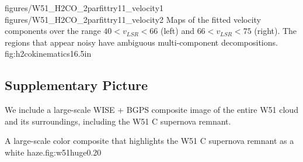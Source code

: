 \FigureTwoAA
{figures/W51_H2CO_2parfittry11_velocity1}
{figures/W51_H2CO_2parfittry11_velocity2}
{Maps of the fitted \formaldehyde velocity components over the range $40 <
v_{LSR} < 66$ \kms (left) and $66 < v_{LSR} < 75$ \kms (right).  The regions
that appear noisy have ambiguous multi-component decompositions.  }
{fig:h2cokinematics}{1}{6.5in}

\subsection{Supplementary Picture}
We include a large-scale WISE + BGPS composite image of the entire W51 cloud and its
surroundings, including the W51 C supernova remnant.

{A large-scale color composite that highlights the W51 C supernova remnant as a
white haze.}{fig:w51huge}{0.2}{0}





